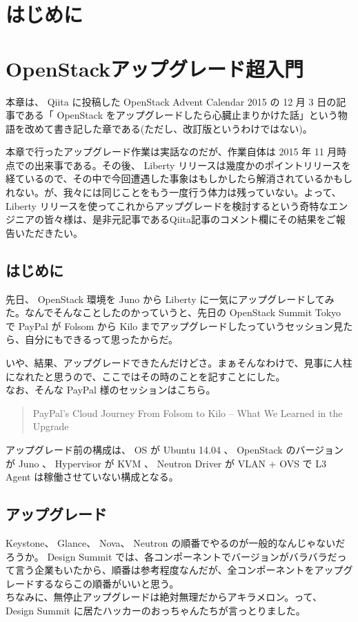 \documentclass[9pt,b5paper,tombo,openany]{jsbook}
\begin{document}
\tableofcontents

\chapter{はじめに}

\setcounter{page}{1}

\chapter{OpenStackアップグレード超入門}
本章は、 Qiita に投稿した OpenStack Advent Calendar 2015 の 12 月 3 日の記事である「 OpenStack をアップグレードしたら心臓止まりかけた話」という物語を改めて書き記した章である(ただし、改訂版というわけではない)。

本章で行ったアップグレード作業は実話なのだが、作業自体は 2015 年 11 月時点での出来事である。その後、 Liberty リリースは幾度かのポイントリリースを経ているので、その中で今回遭遇した事象はもしかしたら解消されているかもしれない。が、我々には同じことをもう一度行う体力は残っていない。よって、 Liberty リリースを使ってこれからアップグレードを検討するという奇特なエンジニアの皆々様は、是非元記事であるQiita記事のコメント欄にその結果をご報告いただきたい。

\section{はじめに}
先日、 OpenStack 環境を Juno から Liberty に一気にアップグレードしてみた。なんでそんなことしたのかっていうと、先日の OpenStack Summit Tokyo で PayPal が Folsom から Kilo までアップグレードしたっていうセッション見たら、自分にもできるって思ったからだ。

いや、結果、アップグレードできたんだけどさ。まぁそんなわけで、見事に人柱になれたと思うので、ここではその時のことを記すことにした。\\[1ex]

\noindent
なお、そんな PayPal 様のセッションはこちら。

\begin{quote}
PayPal's Cloud Journey From Folsom to Kilo -- What We Learned in the Upgrade
\end{quote}

アップグレード前の構成は、 OS が Ubuntu 14.04 、 OpenStack のバージョンが Juno 、 Hypervisor が KVM 、 Neutron Driver が VLAN + OVS で L3 Agent は稼働させていない構成となる。

\section{アップグレード}
Keystone、 Glance、 Nova、 Neutron の順番でやるのが一般的なんじゃないだろうか。 Design Summit では、各コンポーネントでバージョンがバラバラだって言う企業もいたから、順番は参考程度なんだが、全コンポーネントをアップグレードするならこの順番がいいと思う。\\[1ex]
ちなみに、無停止アップグレードは絶対無理だからアキラメロン。って、 Design Summit に居たハッカーのおっちゃんたちが言っとりました。\\[1ex]
\end{document}
